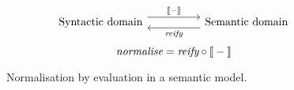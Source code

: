 \documentclass[../../../main.tex]{subfiles}
\begin{document}
\begin{figure}[htb]
\begin{equation*}
\begin{tikzcd}
  \text{Syntactic domain} \arrow[rr, "\text{\textlbrackdbl} - \text{\textrbrackdbl}", shift left=2] &  & \text{Semantic domain} \arrow[ll, "\textit{reify}", shift left=2]
\end{tikzcd}
\end{equation*}
\vspace{0.5ex}
\begin{equation*}
\textit{normalise} = \textit{reify} \circ \text{\textlbrackdbl} - \text{\textrbrackdbl}
\end{equation*}
\caption{Normalisation by evaluation in a semantic model.}
\label{fig:nbe}
\end{figure}
\end{document}
